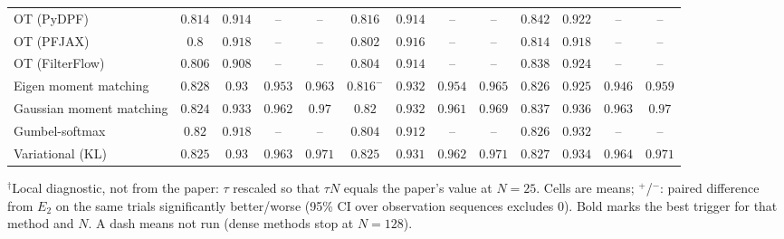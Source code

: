 \begin{table}[ht]
\begin{adjustbox}{max width=\linewidth}
\begin{tabular}{lcccc|cccc|cccc}
OT (PyDPF) & $0.814$ & $0.914$ & -- & -- & $0.816$ & $0.914$ & -- & -- & $\mathbf{0.842}$ & $\mathbf{0.922}$ & -- & -- \\
OT (PFJAX) & $0.8$ & $\mathbf{0.918}$ & -- & -- & $0.802$ & $0.916$ & -- & -- & $\mathbf{0.814}$ & $\mathbf{0.918}$ & -- & -- \\
OT (FilterFlow) & $0.806$ & $0.908$ & -- & -- & $0.804$ & $0.914$ & -- & -- & $\mathbf{0.838}$ & $\mathbf{0.924}$ & -- & -- \\
Eigen moment matching & $\mathbf{0.828}$ & $0.93$ & $\mathbf{0.953}$ & $0.963$ & $0.816^{-}$ & $\mathbf{0.932}$ & $0.954$ & $0.965$ & $0.826$ & $0.925$ & $0.946$ & $\mathbf{0.959}$ \\
Gaussian moment matching & $0.824$ & $0.933$ & $0.962$ & $0.97$ & $0.82$ & $0.932$ & $\mathbf{0.961}$ & $\mathbf{0.969}$ & $\mathbf{0.837}$ & $\mathbf{0.936}$ & $0.963$ & $0.97$ \\
Gumbel-softmax & $0.82$ & $0.918$ & -- & -- & $0.804$ & $0.912$ & -- & -- & $\mathbf{0.826}$ & $\mathbf{0.932}$ & -- & -- \\
Variational (KL) & $0.825$ & $0.93$ & $0.963$ & $\mathbf{0.971}$ & $0.825$ & $0.931$ & $\mathbf{0.962}$ & $0.971$ & $\mathbf{0.827}$ & $\mathbf{0.934}$ & $0.964$ & $0.971$ \\
\bottomrule
\end{tabular}
\end{adjustbox}
\par\smallskip\parbox{0.95\linewidth}{\footnotesize $^\dagger$Local diagnostic, not from the paper: $\tau$ rescaled so that $\tau N$ equals the paper's value at $N{=}25$. Cells are means; $^{+}$/$^{-}$: paired difference from $E_2$ on the same trials significantly better/worse (95\% CI over observation sequences excludes 0). Bold marks the best trigger for that method and $N$. A dash means not run (dense methods stop at $N{=}128$).}
\end{table}

